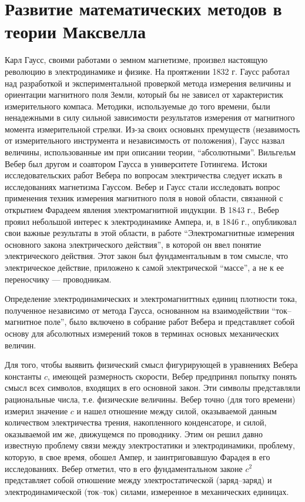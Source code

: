 \documentclass[12pt, oneside, a4paper]{article}
\begin{document}
\section{Развитие математических методов в теории Максвелла}
Карл Гаусс, своими работами о земном магнетизме, произвел настоящую революцию в электродинамике и физике.  На проятжении 1832 г. Гаусс работал над разработкой и экспериментальной проверкой метода измерения величины и ориентации магнитного поля Земли, который бы не зависел от характеристик измерительного компаса. Методики, используемые до того времени, были ненадежными в силу сильной зависимости результатов измерения от магнитного момента измерительной стрелки. Из-за своих основынх премуществ (незавимость от измерительного инструмента и независимость от положения), Гаусс назвал величины, использованные им при описании теории, ``абсолютными''. Вильгельм Вебер  был другом и соавтором Гаусса в университете Готингема. Истоки исследовательских работ Вебера по вопросам электричества следует искать в исследованиях магнетизма Гауссом. Вебер и Гаусс стали исследовать вопрос применения техник измерения магнитного поля в новой области, связанной с открытием Фарадеем явления электромагнитной индукции. В 1843 г., Вебер прояил небольшой интерес к электродинамике Ампера, и, в 1846 г., опубликовал свои важные результаты в этой области, в работе ``Электромагнитные измерения основного закона электрического действия'', в которой он ввел понятие электрического действия. Этот закон был фундаментальным в том смысле, что электрическое действие, приложено к самой электрической ``массе'', а не к ее переносчику --- проводникам. 

Определение электродинамических и электромагниттных единиц плотности тока, полученное независимо от метода Гаусса, основанном на взаимодействии ``ток--магнитное поле'', было включено в собрание работ Вебера и представляет собой основу для абсолютных измерений токов в терминах основых механических величин.

Для того, чтобы выявить физический смысл фигурирующей в уравнениях Вебера константы $c$, имеющей размерность скорости, Вебер предпринял попытку понять смысл всех символов, входящих в его основной закон. Эти символы представляли рациональные числа, т.е. физические величины. Вебер точно (для того времени) измерил значение $c$ и нашел отношение между силой, оказываемой данным количеством электричества трения, накопленного  конденсаторе, и силой, оказываемой им же, движущемся по проводнику. Этим он решил давно известную проблему связи между электростатики и электродинамики, проблему, которую, в свое время, обошел Ампер, и заинтриговавшую Фарадея в его исследованиях. Вебер отметил, что в его фундаментальном законе $c^2$ представляет собой отношение между электростатической (заряд--заряд) и электродинамической (ток--ток) силами, измеренное в механических единицах.
\end{document}
